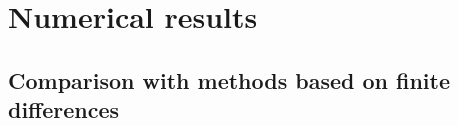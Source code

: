 \documentclass[
    smallextended,  %
    final,        %
]{svjour3}
\newcommand{\rad}[1][k]{\Delta\ifthenelse{\equal{#1}{}}{}{_{#1}}}
\begin{document}


\section{Numerical results}
\label{sec:numerical}

\subsection{Comparison with methods based on finite differences}
\label{ssec:fd}
\end{document}
